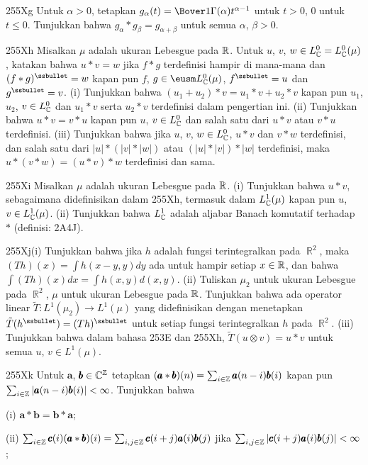 {\sqheader 255Xg Untuk $\alpha>0$, tetapkan
$g_{\alpha}(t)=\Bover1{\Gamma(\alpha)}t^{\alpha-1}$ untuk $t>0$, $0$ untuk
$t\le 0$.   Tunjukkan bahwa $g_{\alpha}*g_{\beta}=g_{\alpha+\beta}$ untuk semua
$\alpha$, $\beta>0$.   

\sqheader 255Xh Misalkan $\mu$ adalah ukuran Lebesgue pada $\Bbb R$.
Untuk $u$, $v$,
$w\in L^0_{\Bbb C}=L^0_{\Bbb C}(\mu)$, katakan bahwa
$u*v=w$ jika $f*g$ terdefinisi hampir di mana-mana dan $(f*g)^{\ssbullet}=w$
kapan pun $f$, $g\in\eusm L^0_{\Bbb C}(\mu)$, $f^{\ssbullet}=u$ dan
$g^{\ssbullet}=v$.   (i) Tunjukkan bahwa $(u_1+u_2)*v=u_1*v+u_2*v$ kapan pun
$u_1$, $u_2$, $v\in L^0_{\Bbb C}$ dan $u_1*v$ serta $u_2*v$ terdefinisi dalam
pengertian ini.   (ii) Tunjukkan bahwa $u*v=v*u$ kapan pun $u$, $v\in L^0_{\Bbb C}$ dan
salah satu dari $u*v$ atau $v*u$ terdefinisi.   (iii) Tunjukkan bahwa jika $u$, $v$,
$w\in L^0_{\Bbb C}$, $u*v$ dan $v*w$ terdefinisi,
dan salah satu dari $|u|*(|v|*|w|)$ atau $(|u|*|v|)*|w|$
terdefinisi, maka $u*(v*w)=(u*v)*w$ terdefinisi dan sama.

\sqheader 255Xi Misalkan $\mu$ adalah ukuran Lebesgue pada $\Bbb R$.
(i) Tunjukkan bahwa $u*v$, sebagaimana didefinisikan dalam 255Xh, termasuk dalam $L^1_{\Bbb C}(\mu)$
kapan pun $u$, $v\in L^1_{\Bbb C}(\mu)$.
(ii) Tunjukkan bahwa $L^1_{\Bbb C}$ adalah
aljabar Banach komutatif terhadap $*$ (definisi: 2A4J).

\spheader 255Xj(i) Tunjukkan bahwa jika $h$ adalah fungsi terintegralkan
pada $\BbbR^2$, maka   $(Th)(x)=\int h(x-y,y)dy$ ada untuk
hampir setiap $x\in\Bbb R$, dan bahwa $\int (Th)(x)dx=\int h(x,y)d(x,y)$.
(ii) Tuliskan $\mu_2$ untuk ukuran Lebesgue pada $\BbbR^2$, $\mu$ untuk
ukuran Lebesgue pada $\Bbb R$.   Tunjukkan bahwa ada operator linear
$\tilde T:L^1(\mu_2)\to L^1(\mu)$ yang didefinisikan dengan menetapkan
$\tilde T(h^{\ssbullet})=(Th)^{\ssbullet}$ untuk setiap fungsi terintegralkan
$h$ pada $\BbbR^2$.   (iii) Tunjukkan bahwa dalam bahasa 253E dan 255Xh,
$\tilde T(u\otimes v)=u*v$ untuk semua $u$, $v\in L^1(\mu)$.

\sqheader 255Xk  Untuk $\pmb{a}$, $\pmb{b}\in\Bbb C^{\Bbb Z}$ tetapkan
$(\pmb{a}*\pmb{b})(n)=\sum_{i\in\Bbb Z}\pmb{a}(n-i)\pmb{b}(i)$ kapan pun
$\sum_{i\in\Bbb Z}|\pmb{a}(n-i)\pmb{b}(i)|<\infty$.   Tunjukkan bahwa

\quad (i) $\pmb{a}*\pmb{b}=\pmb{b}*\pmb{a}$;

\quad (ii) $\sum_{i\in\Bbb Z}\pmb{c}(i)(\pmb{a}*\pmb{b})(i)
=\sum_{i,j\in\Bbb Z}\pmb{c}(i+j)\pmb{a}(i)\pmb{b}(j)$ jika
$\sum_{i,j\in\Bbb Z}|\pmb{c}(i+j)\pmb{a}(i)\pmb{b}(j)|<\infty$;

}
